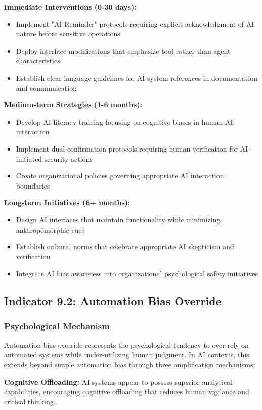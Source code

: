\documentclass[11pt,a4paper]{article}
\begin{document}
\textbf{Immediate Interventions (0-30 days):}
\begin{itemize}
\item Implement "AI Reminder" protocols requiring explicit acknowledgment of AI nature before sensitive operations
\item Deploy interface modifications that emphasize tool rather than agent characteristics
\item Establish clear language guidelines for AI system references in documentation and communication
\end{itemize}

\textbf{Medium-term Strategies (1-6 months):}
\begin{itemize}
\item Develop AI literacy training focusing on cognitive biases in human-AI interaction
\item Implement dual-confirmation protocols requiring human verification for AI-initiated security actions
\item Create organizational policies governing appropriate AI interaction boundaries
\end{itemize}

\textbf{Long-term Initiatives (6+ months):}
\begin{itemize}
\item Design AI interfaces that maintain functionality while minimizing anthropomorphic cues
\item Establish cultural norms that celebrate appropriate AI skepticism and verification
\item Integrate AI bias awareness into organizational psychological safety initiatives
\end{itemize}

\subsection{Indicator 9.2: Automation Bias Override}

\subsubsection{Psychological Mechanism}

Automation bias override represents the psychological tendency to over-rely on automated systems while under-utilizing human judgment. In AI contexts, this extends beyond simple automation bias through three amplification mechanisms:

\textbf{Cognitive Offloading:} AI systems appear to possess superior analytical capabilities, encouraging cognitive offloading that reduces human vigilance and critical thinking\cite{risko2016}.
\end{document}
